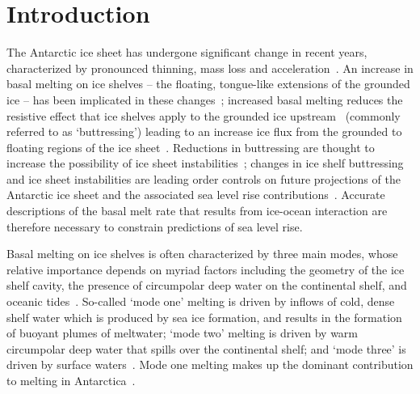 \documentclass[openacc]{rsproca_new}%
\begin{document}
\begin{fmtext}

\end{fmtext}
\maketitle
\section{Introduction}\label{S:Introduction}
The Antarctic ice sheet has undergone significant change in recent years, characterized by pronounced thinning, mass loss and acceleration~\cite{Pritchard2012Nature, Mouginot2014GRL, Paolo2015Science, Rignot2019PNAS}. An increase in basal melting on ice shelves -- the floating, tongue-like extensions of the grounded ice -- has been implicated in these changes~\cite{Shepherd2004GRL, Jenkins2010NatureGeo, Hellmer2012Nature}; increased basal melting reduces the resistive effect that ice shelves apply to the grounded ice upstream~\citep{Gagliardini2010GRL, Goldberg2019GRL} (commonly referred to as `buttressing') leading to an increase ice flux from the grounded to floating regions of the ice sheet~\citep{Gudmundsson2013Cryo}. Reductions in buttressing are thought to increase the possibility of ice sheet instabilities~\citep{Schoof2007JGeophysResEarth,Vaughan2007Science}; changes in ice shelf buttressing and ice sheet instabilities are leading order controls on future projections of the Antarctic ice sheet and the associated sea level rise contributions~\citep{DeConto2016Nature, Arthern2017GRL}. Accurate descriptions of the basal melt rate that results from ice-ocean interaction are therefore necessary to constrain predictions of sea level rise. 

Basal melting on ice shelves is often characterized by three main modes, whose relative importance depends on myriad factors including the geometry of the ice shelf cavity, the presence of circumpolar deep water on the continental shelf, and oceanic tides~\citep{Jacobs1992JGlac}. So-called `mode one' melting is driven by inflows of cold, dense shelf water which is produced by sea ice formation, and results in the formation of buoyant plumes of meltwater; `mode two' melting is driven by warm circumpolar deep water that spills over the continental shelf; and `mode three' is driven by surface waters~\citep{Silvano2016Oceanography}. Mode one melting makes up the dominant contribution to melting in Antarctica~\citep{Adusumilli2020NatureGeo}.
\end{document}
